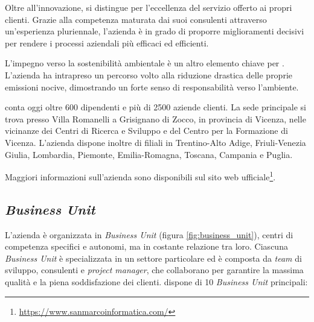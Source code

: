Oltre all'innovazione, \myCompany si distingue per l'eccellenza del servizio offerto ai propri clienti. Grazie alla competenza maturata dai suoi consulenti attraverso un'esperienza pluriennale, l'azienda è in grado di proporre miglioramenti decisivi per rendere i processi aziendali più efficaci ed efficienti.

L'impegno verso la sostenibilità ambientale è un altro elemento chiave per \myCompany. L'azienda ha intrapreso un percorso volto alla riduzione drastica delle proprie emissioni nocive, dimostrando un forte senso di responsabilità verso l'ambiente.

\myCompany conta oggi oltre 600 dipendenti e più di 2500 aziende clienti. La sede principale si trova presso Villa Romanelli a Grisignano di Zocco, in provincia di Vicenza, nelle vicinanze dei Centri di Ricerca e Sviluppo e del Centro per la Formazione di Vicenza. L'azienda dispone inoltre di filiali in Trentino-Alto Adige, Friuli-Venezia Giulia, Lombardia, Piemonte, Emilia-Romagna, Toscana, Campania e Puglia.

Maggiori informazioni sull'azienda sono disponibili sul sito web ufficiale\footnote{\url{https://www.sanmarcoinformatica.com/}}.


\subsection{\emph{Business Unit}}
L'azienda è organizzata in \emph{Business Unit} (figura \ref{fig:business_unit}), centri di competenza specifici e autonomi, ma in costante relazione tra loro. Ciascuna \emph{Business Unit} è specializzata in un settore particolare ed è composta da \emph{team} di sviluppo, consulenti e \emph{project manager}, che collaborano per garantire la massima qualità e la piena soddisfazione dei clienti. \myCompany dispone di 10 \emph{Business Unit} principali:

